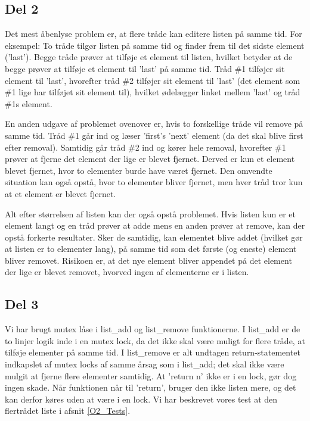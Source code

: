 \subsection{Del 2}
\label{O2_2}
Det mest åbenlyse problem er, at flere tråde kan editere listen på samme tid. For eksempel: To tråde tilgør listen på samme tid og finder frem til det sidste element ('last'). Begge tråde prøver at tilføje et element til listen, hvilket betyder at de begge prøver at tilføje et element til 'last' på samme tid. Tråd \#1 tilføjer sit element til 'last', hvorefter tråd \#2 tilføjer sit element til 'last' (det element som \#1 lige har tilføjet sit element til), hvilket ødelægger linket mellem 'last' og tråd \#1s element.

En anden udgave af problemet ovenover er, hvis to forskellige tråde vil remove på samme tid. Tråd \#1 går ind og læser 'first's 'next' element (da det skal blive first efter removal). Samtidig går tråd \#2 ind og kører hele removal, hvorefter \#1 prøver at fjerne det element der lige er blevet fjernet. Derved er kun et element blevet fjernet, hvor to elementer burde have været fjernet. Den omvendte situation kan også opstå, hvor to elementer bliver fjernet, men hver tråd tror kun at et element er blevet fjernet.

Alt efter størrelsen af listen kan der også opstå problemet. Hvis listen kun er et element langt og en tråd prøver at adde mens en anden prøver at remove, kan der opstå forkerte resultater. Sker de samtidig, kan elementet blive addet (hvilket gør at listen er to elementer lang), på samme tid som det første (og eneste) element bliver removet. Risikoen er, at det nye element bliver appendet på det element der lige er blevet removet, hvorved ingen af elementerne er i listen.

\subsection{Del 3}
\label{O2_3}
Vi har brugt mutex låse i list\_add og list\_remove funktionerne. I list\_add er de to linjer logik inde i en mutex lock, da det ikke skal være muligt for flere tråde, at tilføje elementer på samme tid. I list\_remove er alt undtagen return-statementet indkapslet af mutex locks af samme årsag som i list\_add; det skal ikke være mulgit at fjerne flere elementer samtidig. At 'return n' ikke er i en lock, gør dog ingen skade. Når funktionen når til 'return', bruger den ikke listen mere, og det kan derfor køres uden at være i en lock.
Vi har beskrevet vores test at den flertrådet liste i afsnit \ref{O2_Tests}.

